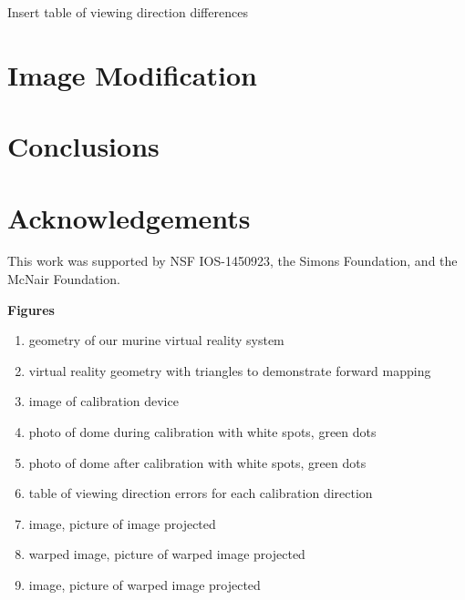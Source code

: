\documentclass{article}
\begin{document}
Insert table of viewing direction differences


\section{Image Modification}

\section{Conclusions}

\section{Acknowledgements}

This work was supported by NSF IOS-1450923, the Simons Foundation, and the McNair Foundation.




\captionsetup[figure]{labelformat=empty} %

\pagebreak

\textbf{Figures}
\begin{enumerate}
  \item geometry of our murine virtual reality system
  \item virtual reality geometry with triangles to demonstrate forward mapping
  \item image of calibration device
  \item photo of dome during calibration with white spots, green dots
  \item photo of dome after calibration with white spots, green dots
  \item table of viewing direction errors for each calibration direction
  \item image, picture of image projected
  \item warped image, picture of warped image projected
  \item image, picture of warped image projected
\end{enumerate}

%
\end{document}
